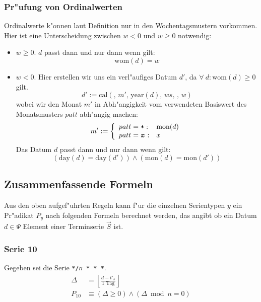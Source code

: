 \documentclass[a4paper]{article}
\newcommand*{\dayf}{\mathrm{day}}
\newcommand*{\monf}{\mathrm{mon}}
\newcommand*{\yearf}{\mathrm{year}}
\newcommand*{\womf}{\mathrm{wom}}
\newcommand*{\calf}{\mathrm{cal}}
\numberwithin{equation}{section}
\begin{document}
\subsubsection{Pr"ufung von Ordinalwerten}
Ordinalwerte k"onnen laut Definition nur in den Wochentagsmustern vorkommen.
Hier ist eine Unterscheidung zwischen $w < 0$ und $w \ge 0$ notwendig:
\begin{itemize}
\item $w \ge 0$. $d$ passt dann und nur dann wenn gilt:
  \begin{equation}\womf(d) = w\end{equation}
\item $w < 0$. Hier erstellen wir uns ein verl"aufiges Datum $d'$,
  da $\forall\ d: \womf(d) \ge 0$ gilt.
  \begin{equation}d' := \calf(,\,m',\,\yearf(d),\,ws,\,,\,w)\end{equation}
  wobei wir den Monat $m'$ in Abh"angigkeit vom verwendeten Basiswert des
  Monatsmusters $patt$ abh"angig machen:
  \begin{equation}
  m' := \left\{\begin{array}{ll}
  patt = \texttt{*} : & \monf(d) \\
  patt = \texttt{\textit{x}} : & x \\
  \end{array}\right.
  \end{equation}
  Das Datum $d$ passt dann und nur dann wenn gilt:
  \begin{equation}
    (\dayf(d) = \dayf(d')) \wedge (\monf(d) = \monf(d'))
  \end{equation}
\end{itemize}


%
%
\subsection{Zusammenfassende Formeln}\label{ssec:dateInSeries}
Aus den oben aufgef"uhrten Regeln kann f"ur die einzelnen Serientypen $y$ ein
Pr"adikat $P_y$ nach folgenden Formeln berechnet werden, das angibt ob ein Datum
$d \in \Psi$ Element einer Terminserie $\vec{S}$ ist.

\subsubsection{Serie 10}
Gegeben sei die Serie \texttt{*/\textit{n} * * *}.
\begin{equation}
\begin{split}
  \Delta & = \left\lfloor\frac{d - t'_s}{1 \textrm{ Tag}}\right\rfloor \\
  P_{10} & \equiv (\Delta \ge 0) \wedge (\Delta \bmod n = 0)
\end{split}
\end{equation}
\end{document}
